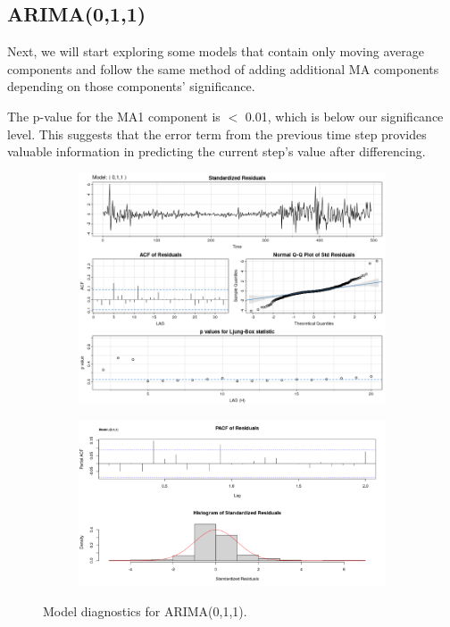 \documentclass[12pt]{article}
\begin{document}
\subsection{ARIMA(0,1,1)}
Next, we will start exploring some models that contain only moving average components and follow the same method of adding additional MA components depending on those components' significance.




The p-value for the MA1 component is $<$ 0.01, which is below our significance level. This suggests that the error term from the previous time step provides valuable information in predicting the current step's value after differencing.

\begin{figure}[h!]
\centering

\begin{subfigure}[b]{0.6\textwidth}
\centering
\includegraphics[width=1\textwidth]{images/arima_011.png}
\label{fig:sub1}
\end{subfigure}

\begin{subfigure}[b]{0.6\textwidth}
\centering
\includegraphics[width=1\textwidth]{images/arima_011_examine.png}
\label{fig:sub2}
\end{subfigure}

\caption{Model diagnostics for ARIMA(0,1,1).}
\label{fig:test}
\end{figure}
\end{document}
